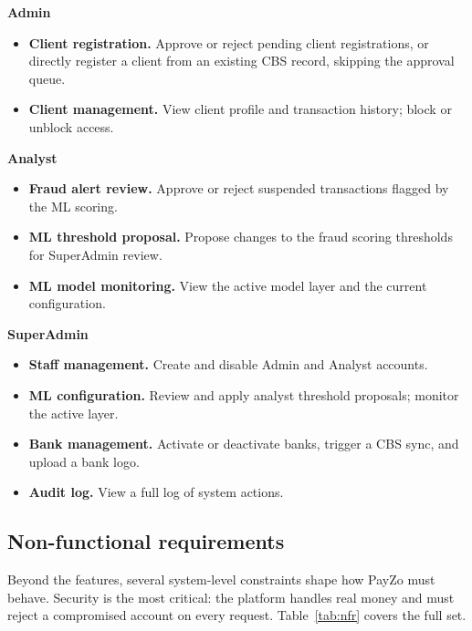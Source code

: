 \documentclass[12pt,a4paper]{report}
\begin{document}
\vspace{4pt}\noindent\textbf{Admin}\par\nopagebreak
\begin{itemize}[leftmargin=1.4em]
  \item \textbf{Client registration.} Approve or reject pending client registrations, or
        directly register a client from an existing CBS record, skipping the approval queue.
  \item \textbf{Client management.} View client profile and transaction history; block or
        unblock access.
\end{itemize}
\newpage
\vspace{4pt}\noindent\textbf{Analyst}\par\nopagebreak
\begin{itemize}[leftmargin=1.4em]
  \item \textbf{Fraud alert review.} Approve or reject suspended transactions flagged by the
        ML scoring.
  \item \textbf{ML threshold proposal.} Propose changes to the fraud scoring thresholds for
        SuperAdmin review.
  \item \textbf{ML model monitoring.} View the active model layer and the current configuration.
\end{itemize}

\vspace{4pt}\noindent\textbf{SuperAdmin}\par\nopagebreak
\begin{itemize}[leftmargin=1.4em]
  \item \textbf{Staff management.} Create and disable Admin and Analyst accounts.
  \item \textbf{ML configuration.} Review and apply analyst threshold proposals; monitor the
        active layer.
  \item \textbf{Bank management.} Activate or deactivate banks, trigger a CBS sync, and upload
        a bank logo.
  \item \textbf{Audit log.} View a full log of system actions.
\end{itemize}
\newpage
\subsection{Non-functional requirements}

Beyond the features, several system-level constraints shape how PayZo must behave. Security
is the most critical: the platform handles real money and must reject a compromised account
on every request. Table~\ref{tab:nfr} covers the full set.
\end{document}
